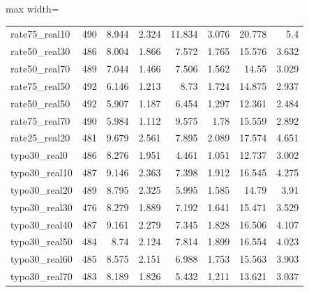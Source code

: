 \documentclass[11pt]{article}
\begin{document}
\begin{table}[H]
\begin{adjustbox}{max width=\textwidth}
\begin{tabular}{lrrrrrrr}
rate75\_real10 & 490 & 8.944 & 2.324 & 11.834 & 3.076 & 20.778 & 5.4 \\
rate50\_real30 & 486 & 8.004 & 1.866 & 7.572 & 1.765 & 15.576 & 3.632 \\
rate50\_real70 & 489 & 7.044 & 1.466 & 7.506 & 1.562 & 14.55 & 3.029 \\
rate75\_real50 & 492 & 6.146 & 1.213 & 8.73 & 1.724 & 14.875 & 2.937 \\
rate50\_real50 & 492 & 5.907 & 1.187 & 6.454 & 1.297 & 12.361 & 2.484 \\
rate75\_real70 & 490 & 5.984 & 1.112 & 9.575 & 1.78 & 15.559 & 2.892 \\
rate25\_real20 & 481 & 9.679 & 2.561 & 7.895 & 2.089 & 17.574 & 4.651 \\
typo30\_real0 & 486 & 8.276 & 1.951 & 4.461 & 1.051 & 12.737 & 3.002 \\
typo30\_real10 & 487 & 9.146 & 2.363 & 7.398 & 1.912 & 16.545 & 4.275 \\
typo30\_real20 & 489 & 8.795 & 2.325 & 5.995 & 1.585 & 14.79 & 3.91 \\
typo30\_real30 & 476 & 8.279 & 1.889 & 7.192 & 1.641 & 15.471 & 3.529 \\
typo30\_real40 & 487 & 9.161 & 2.279 & 7.345 & 1.828 & 16.506 & 4.107 \\
typo30\_real50 & 484 & 8.74 & 2.124 & 7.814 & 1.899 & 16.554 & 4.023 \\
typo30\_real60 & 485 & 8.575 & 2.151 & 6.988 & 1.753 & 15.563 & 3.903 \\
typo30\_real70 & 483 & 8.189 & 1.826 & 5.432 & 1.211 & 13.621 & 3.037 \\
\bottomrule
\end{tabular}
\end{adjustbox}
\end{table}
\end{document}
